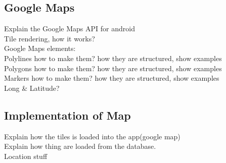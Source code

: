\subsection*{Google Maps}
Explain the Google Maps API for android\\
Tile rendering, how it works?\\
Google Maps elements:\\
Polylines how to make them? how they are structured, show examples\\
Polygons how to make them? how they are structured, show examples\\
Markers how to make them? how they are structured, show examples\\
Long \& Latitude?

\subsection*{Implementation of Map} 
Explain how the tiles is loaded into the app(google map)\\
Explain how thing are loaded from the database.\\
Location stuff
	
